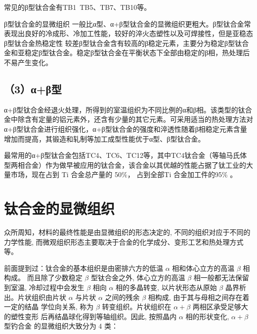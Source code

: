 常见的β型钛合金有TB1~TB5、TB7、TB10等。

β型钛合金的显微组织 一般比α型、α+β型钛合金的显微组织更粗大。β型钛合金常表现出良好的冷成形、冷加工性能，较好的淬火态塑性以及可焊接性，但是亚稳态β型钛合金热稳定性 较差β型钛合金含有较高的β稳定元素，主要分为稳定β型钛合金和亚稳定β型钛合金。稳定β型钛合金在平衡状态下全部由稳定的β相，热处理后不易产生变化。
\subsection*{（3）α+β型}
α+β型钛合金经退火处理，所得到的室温组织为不同比例的α和β相。该类型的钛合金中除含有定量的铝元素外，还含有少量的其它元素。可采用适当的热处理方法对α+β型钛合金进行组织强化，α+β型钛合金的强度和淬透性随着β相稳定元素含量增加而提高，其锻造和轧制等加工成型性能优于α型、β型钛合金。

最常用的α+β型钛合金包括TC4、TC6、TC12等，其中TC4钛合金（等轴马氏体型两相合金）作为做早被应用的钛合金，该合金以其优越的性能占据了钛工业的大量市场，现在占到 Ti 合金总产量的 50$ \%  $， 占到全部Ti 合金加工件的95$ \% $ 。
\section{钛合金的显微组织}
众所周知，材料的最终性能是由显微组织的形态决定的, 不同的组织对应于不同的力学性能, 而微观组织形态主要取决于合金的化学成分、变形工艺和热处理方式等。

前面提到过：钛合金的基本组织是由密排六方的低温 $\alpha$ 相和体心立方的高温 $\beta$ 相构成。 而且除了少数稳定 $\beta$ 型钛合金之外, 体心立方的高温 $\beta$ 相一般都无法保留到室温, 冷却过程中会发生 $\beta$ 相向 $\alpha$ 相的多晶转变, 以片状形态从原始 $\beta$ 晶界析出。片状组织由片状 $\alpha$ 与片状 $\alpha$ 之间的残余 $\beta$ 相构成, 由于其与母相之间存在着一定的结晶 学位向关系, 称为 $\beta$ 转变组织。片状组织在 $\alpha+\beta$ 两相区承受足够大的塑性变形 后再结晶球化得到等轴组织。因此, 按照晶内 $\alpha$ 相的形状变化, $\alpha+\beta$ 型钓合金 的显微组织大致分为 4 类：

